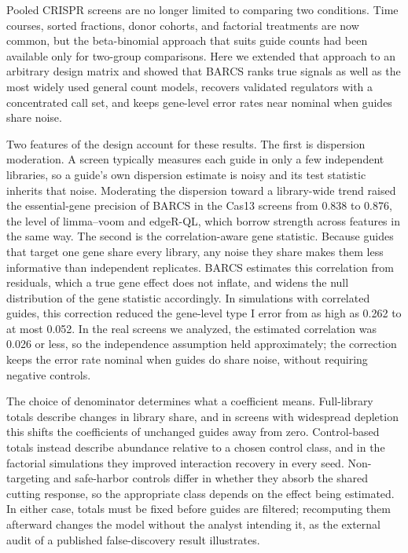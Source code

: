 Pooled CRISPR screens are no longer limited to comparing two conditions.
Time courses, sorted fractions, donor cohorts, and factorial treatments are
now common, but the beta-binomial approach that suits guide counts had been
available only for two-group comparisons.  Here we extended that approach to
an arbitrary design matrix and showed that BARCS ranks true signals as well as
the most widely used general count models, recovers validated regulators with
a concentrated call set, and keeps gene-level error rates near nominal when
guides share noise.

Two features of the design account for these results.  The first is
dispersion moderation.  A screen typically measures each guide in only a few
independent libraries, so a guide's own dispersion estimate is noisy and its
test statistic inherits that noise.  Moderating the dispersion toward a
library-wide trend raised the essential-gene precision of BARCS in the Cas13
screens from 0.838 to 0.876, the level of limma--voom and edgeR-QL, which
borrow strength across features in the same way.  The second is the
correlation-aware gene statistic.  Because guides that target one gene share
every library, any noise they share makes them less informative than
independent replicates.  BARCS estimates this correlation from residuals, which
a true gene effect does not inflate, and widens the null distribution of the
gene statistic accordingly.  In simulations with correlated guides, this
correction reduced the gene-level type I error from as high as 0.262 to at
most 0.052.  In the real screens we analyzed, the estimated correlation was
0.026 or less, so the independence assumption held approximately; the correction keeps the error rate nominal when guides do share noise,
without requiring negative controls.

The choice of denominator determines what a coefficient means.  Full-library
totals describe changes in library share, and in screens with widespread
depletion this shifts the coefficients of unchanged guides away from zero.
Control-based totals instead describe abundance relative to a chosen control
class, and in the factorial simulations they improved interaction recovery in
every seed.  Non-targeting and safe-harbor controls differ in whether they
absorb the shared cutting response, so the appropriate class depends on the
effect being estimated.  In either case, totals must be fixed before guides are
filtered; recomputing them afterward changes the model without the analyst
intending it, as the external audit of a published false-discovery result
illustrates.

